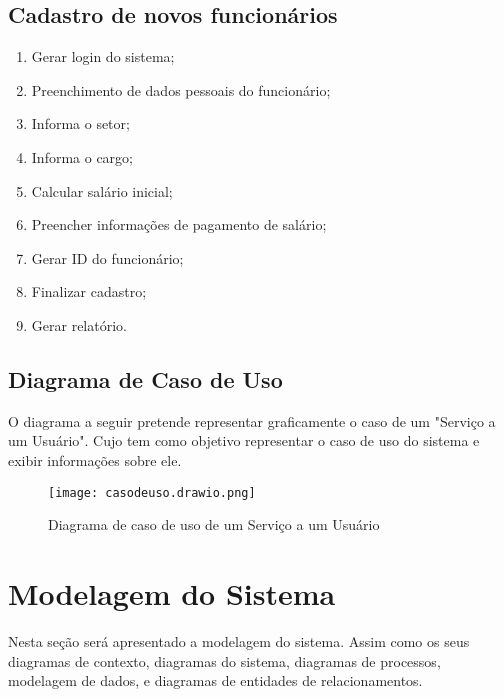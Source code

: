 \subsection{ Cadastro de novos funcionários}
\begin{enumerate}
      \item Gerar login do sistema;
      \item Preenchimento de dados pessoais do funcionário;
      \item Informa o setor;
      \item Informa o cargo;
      \item Calcular salário inicial;
      \item Preencher informações de pagamento de salário;
      \item Gerar ID do funcionário;
      \item Finalizar cadastro;
      \item Gerar relatório.

\end{enumerate}

\subsection{ Diagrama de Caso de Uso}
O diagrama a seguir pretende representar graficamente o caso de um "Serviço a um Usuário".
Cujo tem como objetivo representar o caso de uso do sistema e exibir informações sobre ele.

\begin{figure}[H]
      \begin{center}
            \caption{ Diagrama de caso de uso de um Serviço a um Usuário} \label{afp}
            \texttt{[image: casodeuso.drawio.png]} \\


      \end{center}
\end{figure}








\section{Modelagem do Sistema}
Nesta seção será apresentado a modelagem do sistema. Assim como os seus diagramas de contexto, diagramas do sistema, diagramas de processos, modelagem de dados, e diagramas de entidades de relacionamentos.



